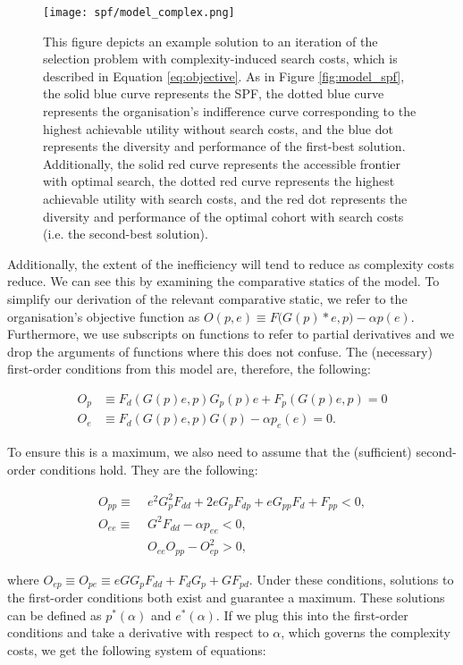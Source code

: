\begin{figure}[!htb]
    \centering
    \caption{This figure depicts an example solution to an iteration of the selection problem with complexity-induced search costs, which is described in Equation \ref{eq:objective}. As in Figure \ref{fig:model_spf}, the solid blue curve represents the SPF, the dotted blue curve represents the organisation's indifference curve corresponding to the highest achievable utility without search costs, and the blue dot represents the diversity and performance of the first-best solution. Additionally, the solid red curve represents the accessible frontier with optimal search, the dotted red curve represents the highest achievable utility with search costs, and the red dot represents the diversity and performance of the optimal cohort with search costs (i.e. the second-best solution).}
    \label{fig:model_complex}
    \texttt{[image: spf/model\_complex.png]} 
\end{figure}

Additionally, the extent of the inefficiency will tend to reduce as complexity costs reduce. We can see this by examining the comparative statics of the model. To simplify our derivation of the relevant comparative static, we refer to the organisation's objective function as $O(p,e)\equiv F\Big(G(p)*e ,p\Big) - \alpha p(e)$. Furthermore, we use subscripts on functions to refer to partial derivatives and we drop the arguments of functions where this does not confuse. The (necessary) first-order conditions from this model are, therefore, the following:

\begin{align}
O_p & \equiv F_{d}(G(p)e,p)G_p(p)e + F_p(G(p)e,p) = 0 \nonumber \\
O_e & \equiv F_{d}(G(p)e,p)G(p) - \alpha p_e(e) = 0. \nonumber
\end{align}

To ensure this is a maximum, we also need to assume that the (sufficient) second-order conditions hold. They are the following:

\begin{align}
O_{pp} \equiv &\;  e^2G_p^2F_{dd} + 2eG_pF_{dp} + eG_{pp}F_d + F_{pp} < 0, \nonumber \\
O_{ee}  \equiv &\;  G^2F_{dd} - \alpha p_{ee} < 0, \nonumber \\
&  \; O_{ee}O_{pp} - O_{ep}^2 > 0, \nonumber
\end{align}

\noindent where $O_{ep} \equiv O_{pe} \equiv eGG_pF_{dd} + F_dG_p + GF_{pd}$. Under these conditions, solutions to the first-order conditions both exist and guarantee a maximum. These solutions can be defined as $p^*(\alpha)$ and $e^*(\alpha)$. If we plug this into the first-order conditions and take a derivative with respect to $\alpha$, which governs the complexity costs, we get the following system of equations:

